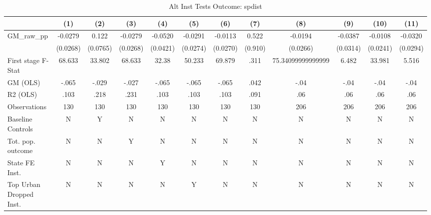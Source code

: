 \begin{table}[htbp]\centering
\def\sym#1{\ifmmode^{#1}\else\(^{#1}\)\fi}
\caption{Alt Inst Tests Outcome: spdist}
\begin{tabular}{l*{11}{c}}
\toprule
            &\multicolumn{1}{c}{(1)}   &\multicolumn{1}{c}{(2)}   &\multicolumn{1}{c}{(3)}   &\multicolumn{1}{c}{(4)}   &\multicolumn{1}{c}{(5)}   &\multicolumn{1}{c}{(6)}   &\multicolumn{1}{c}{(7)}   &\multicolumn{1}{c}{(8)}   &\multicolumn{1}{c}{(9)}   &\multicolumn{1}{c}{(10)}   &\multicolumn{1}{c}{(11)}   \\
\midrule
GM\_raw\_pp   &  -0.0279   &    0.122   &  -0.0279   &  -0.0520   &  -0.0291   &  -0.0113   &    0.522   &  -0.0194   &  -0.0387   &  -0.0108   &  -0.0320   \\
            & (0.0268)   & (0.0765)   & (0.0268)   & (0.0421)   & (0.0274)   & (0.0270)   &  (0.910)   & (0.0266)   & (0.0314)   & (0.0241)   & (0.0294)   \\
\midrule
First stage F-Stat&   68.633   &   33.802   &   68.633   &    32.38   &   50.233   &   69.879   &     .311   &75.34099999999999   &    6.482   &   33.981   &    5.516   \\
GM (OLS)    &    -.065   &    -.029   &    -.027   &    -.065   &    -.065   &    -.065   &     .042   &     -.04   &     -.04   &     -.04   &     -.04   \\
R2 (OLS)    &     .103   &     .218   &     .231   &     .103   &     .103   &     .103   &     .091   &      .06   &      .06   &      .06   &      .06   \\
Observations&      130   &      130   &      130   &      130   &      130   &      130   &      130   &      206   &      206   &      206   &      206   \\
Baseline Controls&        N   &        Y   &        N   &        N   &        N   &        N   &        N   &        N   &        N   &        N   &        N   \\
Tot. pop. outcome&        N   &        N   &        Y   &        N   &        N   &        N   &        N   &        N   &        N   &        N   &        N   \\
State FE Inst.&        N   &        N   &        N   &        Y   &        N   &        N   &        N   &        N   &        N   &        N   &        N   \\
Top Urban Dropped Inst.&        N   &        N   &        N   &        N   &        Y   &        N   &        N   &        N   &        N   &        N   &        N   \\

\end{tabular}
\end{table}
